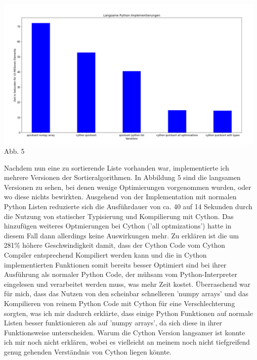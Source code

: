 \documentclass[12pt,a4paper]{article}
\begin{document}
\begin{center}
    \hspace*{-3cm}\includegraphics[width=1.4\textwidth]{./diagramme/matplotlib/pythonlangsam.png}
    Abb. 5
\end{center}

Nachdem nun eine zu sortierende Liste vorhanden war, implementierte ich mehrere Versionen der Sortieralgorithmen.
In Abbildung 5 sind die langsamen Versionen zu sehen, bei denen wenige Optimierungen vorgenommen wurden, oder wo diese nichts bewirkten.
Ausgehend von der Implementation mit normalen Python Listen reduzierte sich die Ausführdauer von ca. 40 auf 14 Sekunden
durch die Nutzung von statischer Typisierung und Kompilierung mit Cython. Das hinzufügen weiteres Optmierungen
bei Cython ('all optmizations') hatte in diesem Fall dann allerdings keine Auswirkungen mehr.
Zu erklären ist die um 281\% höhere Geschwindigkeit damit, dass der Cython Code vom Cython Compiler
entsprechend Kompiliert werden kann und die in Cython implementierten Funktionen somit bereits besser
Optimiert sind bei ihrer Ausführung als normaler Python Code, der mühsam vom Python-Interpreter eingelesen
und verarbeitet werden muss, was mehr Zeit kostet.
Überraschend war für mich, dass das Nutzen von den scheinbar schnelleren 'numpy arrays' und das Kompilieren
von reinem Python Code mit Cython für eine Verschlechterung sorgten, was ich mir dadurch erklärte, dass einige
Python Funktionen auf normale Listen besser funktionieren als auf 'numpy arrays', da sich diese in ihrer Funktionsweise
unterscheiden. Warum die Cython Version langsamer ist konnte ich mir noch nicht erklären, wobei es vielleicht an meinem
noch nicht tiefgreifend genug gehenden Verständnis von Cython liegen könnte.
\end{document}
